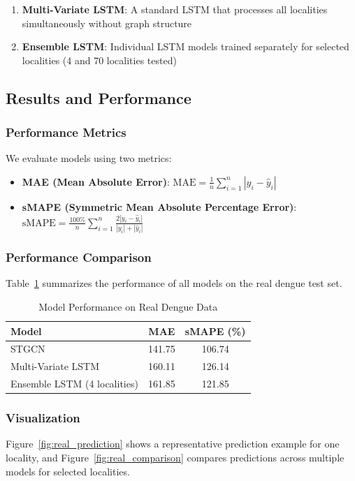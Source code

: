 \documentclass[12pt,a4paper]{article}
\begin{document}
\begin{enumerate}
    \item \textbf{Multi-Variate LSTM}: A standard LSTM that processes all localities simultaneously without graph structure
    \item \textbf{Ensemble LSTM}: Individual LSTM models trained separately for selected localities (4 and 70 localities tested)
\end{enumerate}

\subsection{Results and Performance}

\subsubsection{Performance Metrics}
We evaluate models using two metrics:
\begin{itemize}
    \item \textbf{MAE (Mean Absolute Error)}: $\text{MAE} = \frac{1}{n}\sum_{i=1}^{n}|y_i - \hat{y}_i|$
    \item \textbf{sMAPE (Symmetric Mean Absolute Percentage Error)}: $\text{sMAPE} = \frac{100\%}{n}\sum_{i=1}^{n}\frac{2|y_i - \hat{y}_i|}{|y_i| + |\hat{y}_i|}$
\end{itemize}

\subsubsection{Performance Comparison}
Table~\ref{tab:real_data_results} summarizes the performance of all models on the real dengue test set.

\begin{table}[H]
\centering
\caption{Model Performance on Real Dengue Data}
\label{tab:real_data_results}
\begin{tabular}{|l|c|c|}
\hline
\textbf{Model} & \textbf{MAE} & \textbf{sMAPE (\%)} \\
\hline
STGCN & 141.75 & 106.74 \\
Multi-Variate LSTM & 160.11 & 126.14 \\
Ensemble LSTM (4 localities) & 161.85 & 121.85 \\
\hline
\end{tabular}
\end{table}

\subsubsection{Visualization}
Figure~\ref{fig:real_prediction} shows a representative prediction example for one locality, and Figure~\ref{fig:real_comparison} compares predictions across multiple models for selected localities.
\end{document}
